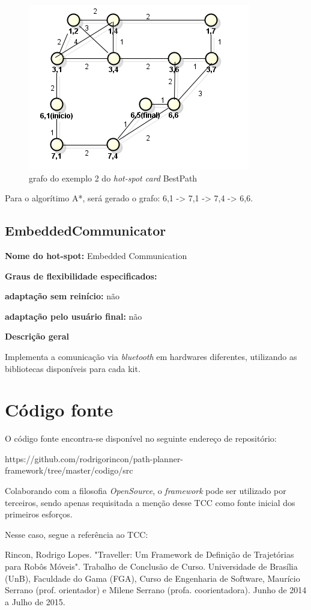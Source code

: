 \begin{apendicesenv}
\begin{figure}[H]
	\centering
	\label{figXX3}
		\includegraphics[keepaspectratio=true,scale=0.7]{figuras/grafohotspotcard2.PNG}
	\caption{grafo do exemplo 2 do \textit{hot-spot card} BestPath}
\end{figure}

Para o algorítimo A*, será gerado o grafo: 6,1 -> 7,1 -> 7,4 -> 6,6.

\section{EmbeddedCommunicator}

{\large \textbf{Nome do hot-spot:}} Embedded Communication

{\large \textbf{Graus de flexibilidade especificados:}}

\textbf{adaptação sem reinício:} não

\textbf{adaptação pelo usuário final:} não

{\large \textbf{Descrição geral}}

Implementa a comunicação via \textit{bluetooth} em hardwares diferentes, utilizando as bibliotecas disponíveis para cada kit.

\chapter{Código fonte}

O código fonte encontra-se disponível no seguinte endereço de repositório: 

https://github.com/rodrigorincon/path-planner-framework/tree/master/codigo/src 

Colaborando com a filosofia \textit{OpenSource}, o \textit{framework} pode ser utilizado por terceiros, sendo apenas requisitada a menção desse TCC como fonte inicial dos primeiros esforços.

Nesse caso, segue a referência ao TCC:

Rincon, Rodrigo Lopes. "Traveller: Um Framework de Definição de Trajetórias para Robôs Móveis". Trabalho de Conclusão de Curso. Universidade de Brasília (UnB), Faculdade do Gama (FGA), Curso de Engenharia de Software, Maurício Serrano (prof. orientador) e Milene Serrano (profa. coorientadora). Junho de 2014 a Julho de 2015.

\end{apendicesenv}
